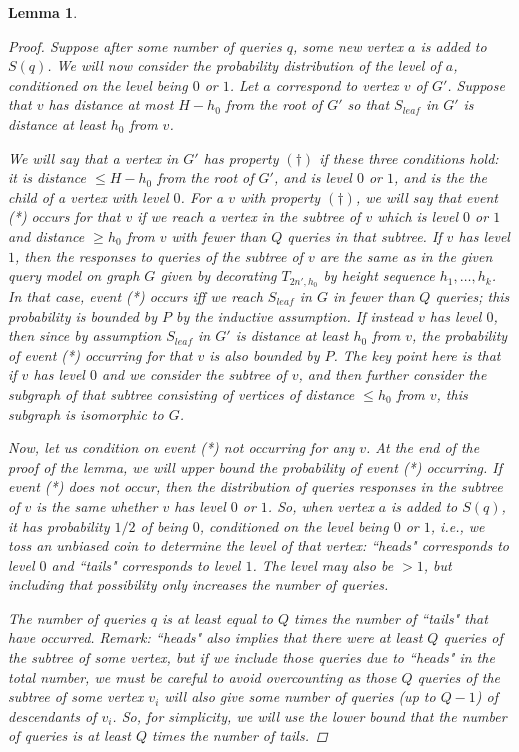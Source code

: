 \documentclass[letterpaper,onecolumn]{quantumarticle}
\newtheorem{lemma}{Lemma}
\begin{document}
\begin{lemma}
\begin{proof}
Suppose after some number of queries $q$, some new vertex $a$ is added to $S(q)$.  We will now consider the probability distribution of the level of $a$, conditioned on the level being $0$ or $1$.
Let $a$ correspond to vertex $v$ of $G'$.
Suppose that 
$v$ has distance at most $H-h_0$ from the root of $G'$ so that $S_{leaf}$ in $G'$ is distance at least $h_0$ from $v$.

We will say that a vertex in $G'$ has property $(\dagger)$ if these three conditions hold:
it is distance $\leq H-h_0$ from the root of $G'$, and is level $0$ or $1$, and is the 
the child of a vertex with level $0$.
For a $v$ with property $(\dagger)$, we will say that
event (*) occurs for that $v$ if we reach a vertex in the subtree of $v$ which is level $0$ or $1$ and distance $\geq h_0$ from $v$ with fewer than $Q$ queries in that subtree.
If $v$ has level $1$, then 
the responses to queries of the subtree of $v$ are the same as in the 
given query model on graph $G$ given by
decorating $T_{2n',h_0}$ by height sequence $h_1,\ldots,h_k$.
In that case, event (*) occurs iff we reach $S_{leaf}$ in $G$ in fewer than $Q$ queries; this probability
is bounded by $P$ by the inductive assumption.
If instead
$v$ has level $0$, then since by assumption $S_{leaf}$ in $G'$ is distance at least $h_0$ from $v$, the probability of 
event (*) occurring for that $v$ is also bounded by $P$.
The key point here is that if $v$ has level $0$ and we consider the subtree of $v$, and then further consider the subgraph of that subtree consisting of vertices of distance $\leq h_0$ from $v$, this subgraph is isomorphic to $G$.

Now, let us condition on event (*) {\it not} occurring for {\it any} $v$.  At the end of the proof of the lemma, we will upper bound the probability of event (*) occurring.
If event (*) does not occur, then the distribution of queries responses in the subtree of $v$ is the same whether $v$ has level $0$ or $1$.
So, when vertex $a$ is added to $S(q)$, it has probability $1/2$ of being $0$, conditioned on the level being $0$ or $1$, i.e., 
we toss an unbiased coin to determine the level of that vertex: ``heads" corresponds to level $0$ and ``tails" corresponds to level $1$.  The level may also be $>1$, but including that possibility only increases the number of queries.

The number of queries $q$ is at least equal to $Q$ times the number of ``tails" that have occurred.
Remark:
``heads" also implies that there were at least $Q$ queries of the subtree of some vertex, but if we include those queries due to ``heads" in the total number, we must be careful to avoid overcounting
 as those $Q$ queries of the subtree of some vertex $v_i$ will also give some number of queries (up to $Q-1$) of descendants of $v_i$.
So, for simplicity, we will use the lower bound that the number of queries is at least $Q$ times the number of tails.


\end{proof}
\end{lemma}
\end{document}
